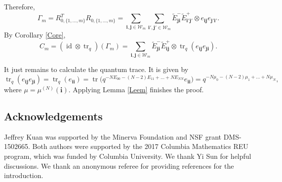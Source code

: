 \documentclass[pdftex]{sigma}
\numberwithin{equation}{section}
\DeclareMathOperator{\tr}{tr}
\DeclareMathOperator{\id}{id}
\newcommand{\ii}{{\mathbf{i}}}
\newcommand{\jj}{{\mathbf{j}}}
\begin{document}
Therefore,
\[
\Gamma_m = R^T_{0,\{1,\dots,m\} } R_{0,\{1,\dots,m\} } = \sum_{\ii,\jj \in \mathcal{W}_m } \sum_{\ii',\jj' \in \mathcal{W}_m } \tilde{E}_{\jj \ii}^-\tilde{E}_{\ii'\jj'}^+ \otimes e_{\ii\jj}e_{\jj'\ii'}.
\]
By Corollary \ref{Core},
\[
C_m = (\id \otimes \tr_q)(\Gamma_m) = \sum_{\ii,\jj \in \mathcal{W}_m } \tilde{E}_{\jj \ii}^-\tilde{E}_{\ii\jj}^+ \otimes \tr_q(e_{\ii\jj}e_{\jj\ii}).
\]

It just remains to calculate the quantum trace. It is given by
\[
\tr_q(e_{\ii\jj}e_{\jj\ii}) = \tr_q(e_{\ii\ii}) = \tr\big(q^{-NE_{00} -(N-2)E_{11} + \dots + NE_{NN}} e_{\ii\ii}\big) = q^{-N\mu_{0} -(N-2)\mu_{1} + \dots + N\mu_{N}},
\]
where $\mu=\mu^{(N)}(\ii)$. Applying Lemma \ref{Leem} finishes the proof.


\subsection*{Acknowledgements}
Jeffrey Kuan was supported by the Minerva Foundation and NSF grant DMS-1502665. Both authors were supported by the 2017 Columbia Mathematics REU program, which was funded by Columbia University. We thank Yi Sun for helpful discussions. We thank an anonymous referee for providing references for the introduction.
\end{document}
